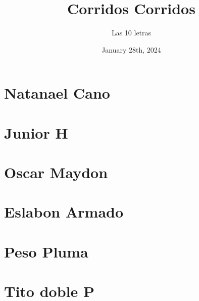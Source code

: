\documentclass{article}
\title{Corridos Corridos}
\date{January 28th, 2024}
\author{Las 10 letras}
\begin{document}
\maketitle{}
\tableofcontents

\renewcommand\guitarPreAccord{\color{amaranth}\footnotesize\strut\bfseries}

%
\newpage
\section{Natanael Cano}














\section{Junior H}









\section{Oscar Maydon}


\section{Eslabon Armado}





\section{Peso Pluma}	



\section{Tito doble P}



\end{document}
